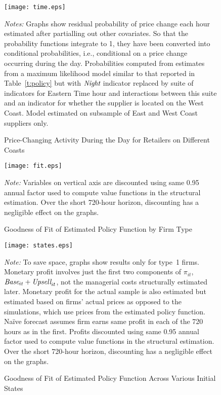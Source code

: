 \documentclass[11pt]{article}
\newcommand{\Night}{\mbox{\it Night}}
\newcommand{\Base}{\mbox{\it Base}}
\newcommand{\Upsell}{\mbox{\it Upsell}}
\begin{document}
\begin{figure}[p]
\centering
\caption{\label{f:time}Price-Changing Activity During the Day for Retailers on Different Coasts} 
\vspace{3ex}
\texttt{[image: time.eps]}\\[3ex]
\parbox{\textwidth}{\footnotesize {\em Notes:} Graphs show residual
  probability of price change each hour estimated after partialling
  out other covariates. So that the probability functions integrate to
  1, they have been converted into conditional probabilities, i.e.,
  conditional on a price change occurring during the
  day. Probabilities computed from estimates from a maximum likelihood
  model similar to that reported in Table~\ref{t:policy} but with
  $\Night$ indicator replaced by suite of indicators for Eastern Time
  hour and interactions between this suite and an indicator for
  whether the supplier is located on the West Coast. Model estimated
  on subsample of East and West Coast suppliers only.}
\end{figure}

\clearpage

\begin{figure}
\centering
\caption{\label{f:fit}Goodness of Fit of Estimated Policy Function by Firm Type}
\vspace{5ex}
\texttt{[image: fit.eps]}\\[5ex]
\parbox{\textwidth}{\footnotesize {\em Note:} Variables on vertical
  axis are discounted using same 0.95 annual factor used to compute
  value functions in the structural estimation. Over the short
  720-hour horizon, discounting has a negligible effect on the
  graphs.}
\end{figure}

\clearpage

\begin{figure}
\centering
\caption{\label{f:states}Goodness of Fit of Estimated Policy Function Across Various Initial States}
\vspace{5ex}
\texttt{[image: states.eps]}\\[5ex]
\parbox{\textwidth}{\footnotesize {\em Note:} To save space, graphs
  show results only for type~1 firms.  Monetary profit involves just
  the first two components of $\pi_{it}$, $\Base_{it} + \Upsell_{it}$,
  not the managerial costs structurally estimated later.  Monetary
  profit for the actual sample is also estimated but estimated based
  on firms' actual prices as opposed to the simulations, which use
  prices from the estimated policy function. Na\"{i}ve forecast
  assumes firm earns same profit in each of the 720 hours as in the
  first.  Profits discounted using same 0.95 annual factor used to
  compute value functions in the structural estimation.  Over the
  short 720-hour horizon, discounting has a negligible effect on the
  graphs.}
\end{figure}
\end{document}
